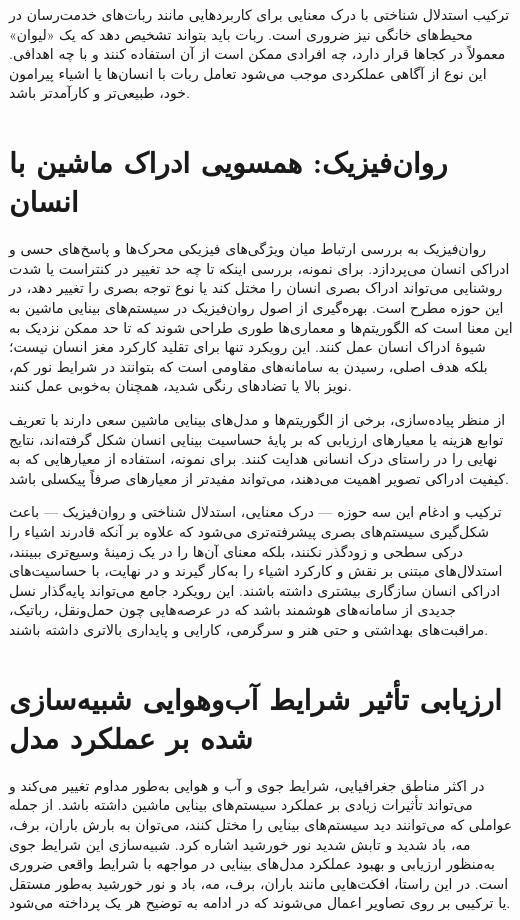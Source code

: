 ترکیب استدلال شناختی با درک معنایی برای کاربردهایی مانند ربات‌های خدمت‌رسان در محیط‌های خانگی نیز ضروری است. ربات باید بتواند تشخیص دهد که یک «لیوان» معمولاً در کجاها قرار دارد، چه افرادی ممکن است از آن استفاده کنند و با چه اهدافی. این نوع از آگاهی عملکردی موجب می‌شود تعامل ربات با انسان‌ها یا اشیاء پیرامون خود، طبیعی‌تر و کارآمدتر باشد. 

\section*{روان‌فیزیک: همسویی ادراک ماشین با انسان}
روان‌فیزیک به بررسی ارتباط میان ویژگی‌های فیزیکی محرک‌ها و پاسخ‌های حسی و ادراکی انسان می‌پردازد. برای نمونه، بررسی اینکه تا چه حد تغییر در کنتراست یا شدت روشنایی می‌تواند ادراک بصری انسان را مختل کند یا نوع توجه بصری را تغییر دهد، در این حوزه مطرح است. بهره‌گیری از اصول روان‌فیزیک در سیستم‌های بینایی ماشین به این معنا است که الگوریتم‌ها و معماری‌ها طوری طراحی شوند که تا حد ممکن نزدیک به شیوهٔ ادراک انسان عمل کنند. این رویکرد تنها برای تقلید کارکرد مغز انسان نیست؛ بلکه هدف اصلی، رسیدن به سامانه‌های مقاومی است که بتوانند در شرایط نور کم، نویز بالا یا تضادهای رنگی شدید، همچنان به‌خوبی عمل کنند.

از منظر پیاده‌سازی، برخی از الگوریتم‌ها و مدل‌های بینایی ماشین سعی دارند با تعریف توابع هزینه یا معیارهای ارزیابی که بر پایهٔ حساسیت بینایی انسان شکل گرفته‌اند، نتایج نهایی را در راستای درک انسانی هدایت کنند. برای نمونه، استفاده از معیارهایی که به کیفیت ادراکی تصویر اهمیت می‌دهند، می‌تواند مفیدتر از معیارهای صرفاً پیکسلی باشد. 

ترکیب و ادغام این سه حوزه — درک معنایی، استدلال شناختی و روان‌فیزیک — باعث شکل‌گیری سیستم‌های بصری پیشرفته‌تری می‌شود که علاوه بر آنکه قادرند اشیاء را درکی سطحی و زودگذر نکنند، بلکه معنای آن‌ها را در یک زمینهٔ وسیع‌تری ببینند، استدلال‌های مبتنی بر نقش و کارکرد اشیاء را به‌کار گیرند و در نهایت، با حساسیت‌های ادراکی انسان سازگاری بیشتری داشته باشند. این رویکرد جامع می‌تواند پایه‌گذار نسل جدیدی از سامانه‌های هوشمند باشد که در عرصه‌هایی چون حمل‌ونقل، رباتیک، مراقبت‌های بهداشتی و حتی هنر و سرگرمی، کارایی و پایداری بالاتری داشته باشند.


\section{ارزیابی تأثیر شرایط آب‌وهوایی شبیه‌سازی شده بر عملکرد مدل}
در اکثر مناطق جغرافیایی، شرایط جوی و آب و هوایی به‌طور مداوم تغییر می‌کند و می‌تواند تأثیرات زیادی بر عملکرد سیستم‌های بینایی ماشین داشته باشد. از جمله عواملی که می‌توانند دید سیستم‌های بینایی را مختل کنند، می‌توان به بارش باران، برف، مه، باد شدید و تابش شدید نور خورشید اشاره کرد. شبیه‌سازی این شرایط جوی به‌منظور ارزیابی و بهبود عملکرد مدل‌های بینایی در مواجهه با شرایط واقعی ضروری است. در این راستا، افکت‌هایی مانند باران، برف، مه، باد و نور خورشید به‌طور مستقل یا ترکیبی بر روی تصاویر اعمال می‌شوند که در ادامه به توضیح هر یک پرداخته می‌شود.


